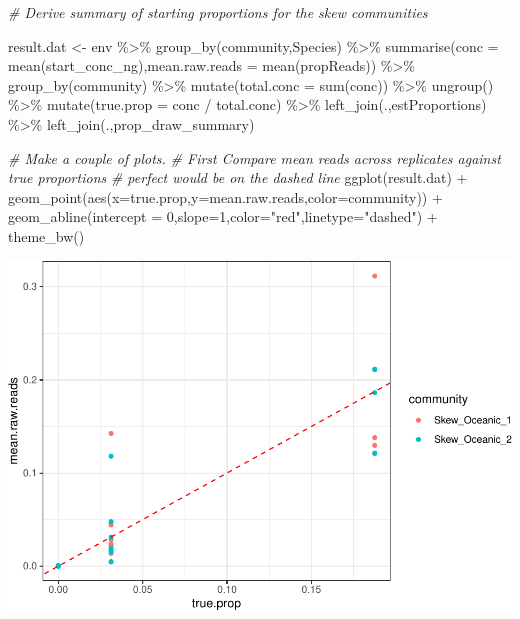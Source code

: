 \documentclass[
]{article}
\newenvironment{Shaded}{\begin{snugshade}}{\end{snugshade}}
\newcommand{\AttributeTok}[1]{\textcolor[rgb]{0.77,0.63,0.00}{#1}}
\newcommand{\CommentTok}[1]{\textcolor[rgb]{0.56,0.35,0.01}{\textit{#1}}}
\newcommand{\DecValTok}[1]{\textcolor[rgb]{0.00,0.00,0.81}{#1}}
\newcommand{\FunctionTok}[1]{\textcolor[rgb]{0.00,0.00,0.00}{#1}}
\newcommand{\NormalTok}[1]{#1}
\newcommand{\OtherTok}[1]{\textcolor[rgb]{0.56,0.35,0.01}{#1}}
\newcommand{\SpecialCharTok}[1]{\textcolor[rgb]{0.00,0.00,0.00}{#1}}
\newcommand{\StringTok}[1]{\textcolor[rgb]{0.31,0.60,0.02}{#1}}
\begin{document}
\begin{Shaded}
\begin{Highlighting}[]
\CommentTok{\# Derive summary of starting proportions for the skew communities}

\NormalTok{result.dat }\OtherTok{\textless{}{-}}\NormalTok{ env }\SpecialCharTok{\%\textgreater{}\%} \FunctionTok{group\_by}\NormalTok{(community,Species) }\SpecialCharTok{\%\textgreater{}\%}
                  \FunctionTok{summarise}\NormalTok{(}\AttributeTok{conc =} \FunctionTok{mean}\NormalTok{(start\_conc\_ng),}\AttributeTok{mean.raw.reads =} \FunctionTok{mean}\NormalTok{(propReads)) }\SpecialCharTok{\%\textgreater{}\%}
                  \FunctionTok{group\_by}\NormalTok{(community) }\SpecialCharTok{\%\textgreater{}\%}
                  \FunctionTok{mutate}\NormalTok{(}\AttributeTok{total.conc =} \FunctionTok{sum}\NormalTok{(conc)) }\SpecialCharTok{\%\textgreater{}\%}
                  \FunctionTok{ungroup}\NormalTok{() }\SpecialCharTok{\%\textgreater{}\%}
                  \FunctionTok{mutate}\NormalTok{(}\AttributeTok{true.prop =}\NormalTok{ conc }\SpecialCharTok{/}\NormalTok{ total.conc) }\SpecialCharTok{\%\textgreater{}\%}
                  \FunctionTok{left\_join}\NormalTok{(.,estProportions) }\SpecialCharTok{\%\textgreater{}\%}
                  \FunctionTok{left\_join}\NormalTok{(.,prop\_draw\_summary)}

\CommentTok{\# Make a couple of plots. }
\CommentTok{\# First Compare mean reads across replicates against true proportions}
\CommentTok{\# perfect would be on the dashed line}
\FunctionTok{ggplot}\NormalTok{(result.dat) }\SpecialCharTok{+}
    \FunctionTok{geom\_point}\NormalTok{(}\FunctionTok{aes}\NormalTok{(}\AttributeTok{x=}\NormalTok{true.prop,}\AttributeTok{y=}\NormalTok{mean.raw.reads,}\AttributeTok{color=}\NormalTok{community)) }\SpecialCharTok{+}
    \FunctionTok{geom\_abline}\NormalTok{(}\AttributeTok{intercept =} \DecValTok{0}\NormalTok{,}\AttributeTok{slope=}\DecValTok{1}\NormalTok{,}\AttributeTok{color=}\StringTok{"red"}\NormalTok{,}\AttributeTok{linetype=}\StringTok{"dashed"}\NormalTok{) }\SpecialCharTok{+}
    \FunctionTok{theme\_bw}\NormalTok{()}
\end{Highlighting}
\end{Shaded}

\includegraphics{Appendix_S4_files/figure-latex/stan_plots-1.pdf}
\end{document}
